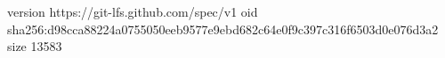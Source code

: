 version https://git-lfs.github.com/spec/v1
oid sha256:d98cca88224a0755050eeb9577e9ebd682c64e0f9c397c316f6503d0e076d3a2
size 13583
